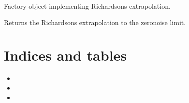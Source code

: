 \documentclass[letterpaper,10pt,english]{sphinxmanual}
\begin{document}
\begin{fulllineitems}
\label{\detokenize{index:mitiq.factories.RichardsonFactory}}
Factory object implementing Richardson\textquotesingle{}s extrapolation.

\begin{fulllineitems}
\label{\detokenize{index:mitiq.factories.RichardsonFactory.reduce}}
Returns the Richardson\textquotesingle{}s extrapolation to the zero\sphinxhyphen{}noise limit.

\end{fulllineitems}


\end{fulllineitems}



\chapter{Indices and tables}
\label{\detokenize{index:indices-and-tables}}\begin{itemize}
\item {} 

\item {} 

\item {} 

\end{itemize}


\renewcommand{\indexname}{Python Module Index}
\begin{sphinxtheindex}
\let\bigletter\sphinxstyleindexlettergroup
\bigletter{m}
\item\relax{}
\item\relax{}
\end{sphinxtheindex}

\renewcommand{\indexname}{Index}
\printindex
\end{document}
